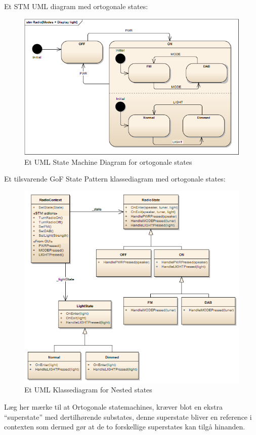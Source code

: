 Et STM UML diagram med ortogonale states:

\begin{figure}[H]
	\centering
	\includegraphics[width=0.7\linewidth]{figs/state/RadioModesDisplayLight}
	\caption{Et UML State Machine Diagram for ortogonale states}
	\label{fig:umlOrtogonalState}
\end{figure}

Et tilsvarende GoF State Pattern klassediagram med ortogonale states:

\begin{figure}[H]
	\centering
	\includegraphics[width=0.7\linewidth]{figs/state/RadioOrthogonal_SP}
	\caption{Et UML Klassediagram for Nested states}
	\label{fig:UMLClassOrtogonalState}
\end{figure}

Læg her mærke til at Ortogonale statemachines, kræver blot en ekstra “superstate” med dertilhørende substates, denne superstate bliver en reference i contexten som dermed gør at de to forskellige superstates kan tilgå hinanden.

